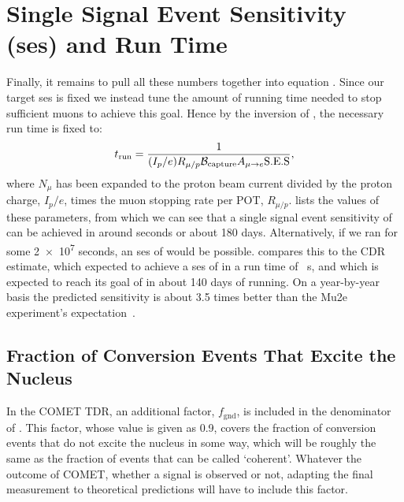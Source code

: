 \section{Single Signal Event Sensitivity (\acs{ses}) and Run Time}
\TabSensParams
\TabSensEstimates
Finally, it remains to pull all these numbers together into equation .
Since our target \ac{ses} is fixed we instead tune the amount of running time needed to stop sufficient muons to achieve this goal. Hence by the inversion of , the necessary run time is fixed to:
\begin{equation}
	t_\textrm{run}=\frac{1}{(I_p/e){R}_{\mu/p}\mathcal{B}_\mathrm{capture} A_{\mu\rightarrow e}\mathrm{S.E.S}},
	\eqlabel{sense:runtime}
\end{equation}
where $N_\mu$ has been expanded to the proton beam current divided by the proton charge, $I_p/e$, times the muon stopping rate per \ac{POT}, $R_{\mu/p}$.
 lists the values of these parameters, from which we can see that a single signal event sensitivity of \sensePII can be achieved in around \VarPredictedSES seconds or about 180 days.
Alternatively, if we ran for some \num{2e7} seconds, an \acf{ses} of \VarPredictedSESCDRRunTime would be possible.
 compares this to the CDR estimate, which expected to achieve a \ac{ses} of  in a run time of ~s, and \phaseI which is expected to reach its goal of \sensePI in about 140 days of running.
On a year-by-year basis the predicted \phaseII sensitivity is about 3.5 times better than the Mu2e experiment's expectation~\cite{Mu2e2014}. 

\subsection{Fraction of Conversion Events That Excite the Nucleus}
In the COMET \phaseI TDR, an additional factor, $f_\textrm{gnd}$, is included in the denominator of .
This factor, whose value is given as 0.9, covers the fraction of conversion events that do not excite the nucleus in some way, which will be roughly the same as the fraction of events that can be called `coherent'.
Whatever the outcome of COMET, whether a signal is observed or not, adapting the final measurement to theoretical predictions will have to include this factor.

